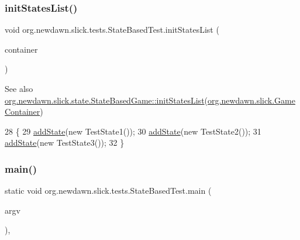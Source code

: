 \subsubsection{\texorpdfstring{init\+States\+List()}{initStatesList()}}
{\footnotesize\ttfamily void org.\+newdawn.\+slick.\+tests.\+State\+Based\+Test.\+init\+States\+List (\begin{DoxyParamCaption}\item[{\mbox{\hyperlink{classorg_1_1newdawn_1_1slick_1_1_game_container}{Game\+Container}}}]{container }\end{DoxyParamCaption})\hspace{0.3cm}{\ttfamily [inline]}}

\begin{DoxySeeAlso}{See also}
\mbox{\hyperlink{classorg_1_1newdawn_1_1slick_1_1state_1_1_state_based_game_af62d7a82f042c5b2d73e102ab94a07c0}{org.\+newdawn.\+slick.\+state.\+State\+Based\+Game\+::init\+States\+List}}(\mbox{\hyperlink{classorg_1_1newdawn_1_1slick_1_1_game_container}{org.\+newdawn.\+slick.\+Game\+Container}}) 
\end{DoxySeeAlso}

\begin{DoxyCode}
28                                                         \{
29         \mbox{\hyperlink{classorg_1_1newdawn_1_1slick_1_1state_1_1_state_based_game_acfd4acadb4a4f79fddd7e76250da37dc}{addState}}(\textcolor{keyword}{new} TestState1());
30         \mbox{\hyperlink{classorg_1_1newdawn_1_1slick_1_1state_1_1_state_based_game_acfd4acadb4a4f79fddd7e76250da37dc}{addState}}(\textcolor{keyword}{new} TestState2());
31         \mbox{\hyperlink{classorg_1_1newdawn_1_1slick_1_1state_1_1_state_based_game_acfd4acadb4a4f79fddd7e76250da37dc}{addState}}(\textcolor{keyword}{new} TestState3());
32     \}
\end{DoxyCode}
\mbox{\label{classorg_1_1newdawn_1_1slick_1_1tests_1_1_state_based_test_a7a7ee9e069ada40fb4fadc2e36cd1d9f}} 
\subsubsection{\texorpdfstring{main()}{main()}}
{\footnotesize\ttfamily static void org.\+newdawn.\+slick.\+tests.\+State\+Based\+Test.\+main (\begin{DoxyParamCaption}\item[{String \mbox{[}$\,$\mbox{]}}]{argv }\end{DoxyParamCaption})\hspace{0.3cm}{\ttfamily [inline]}, {\ttfamily [static]}}

